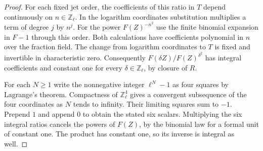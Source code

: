 \documentclass[a4paper,11pt]{article}
\theoremstyle{definition}
\theoremstyle{remark}
\numberwithin{equation}{section}
\begin{document}
\begin{proof}
For each fixed jet order, the coefficients of this ratio in
\(T\) depend continuously on \(n\in\mathbb Z_\ell\).
In the logarithm coordinates substitution multiplies a term
of degree \(j\) by \(n^j\). For the power \(F(Z)^{-n^2}\)
use the finite binomial expansion in \(F-1\) through this
order. Both calculations have coefficients polynomial in \(n\)
over the fraction field. The change from logarithm coordinates
to \(T\) is fixed and invertible in characteristic zero.
Consequently \(F(\delta Z)/F(Z)^{\delta^2}\) has integral
coefficients and constant one for every \(\delta\in\mathbb Z_\ell\),
by closure of \(R\).

For each \(N\ge1\) write the nonnegative integer \(\ell^N-1\)
as four squares by Lagrange's theorem. Compactness of
\(\mathbb Z_\ell^4\) gives a convergent subsequence of the
four coordinates as \(N\) tends to infinity. Their limiting
squares sum to \(-1\). Prepend \(1\) and append \(0\) to
obtain the stated six scalars. Multiplying the six integral
ratios cancels the powers of \(F(Z)\), by the binomial law
for a formal unit of constant one. The product has constant
one, so its inverse is integral as well.
\end{proof}
\end{document}
